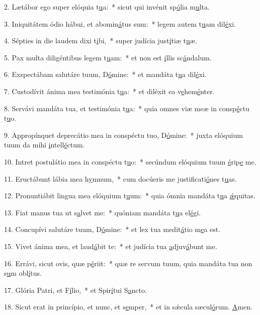 2. Lætábor ego super elóquia t\uline{u}a:~* sicut qui invénit sp\uline{ó}lia m\uline{u}lta.\par 
3. Iniquitátem ódio hábui, et abomin\uline{á}tus sum:~* legem autem t\uline{u}am dil\uline{é}xi.\par 
4. Sépties in die laudem dixi t\uline{i}bi,~* super judícia just\uline{í}tiæ t\uline{u}æ.\par 
5. Pax multa diligéntibus legem t\uline{u}am:~* et non est \uline{i}llis sc\uline{á}ndalum.\par 
6. Exspectábam salutáre tuum, D\uline{ó}mine:~* et mandáta t\uline{u}a dil\uline{é}xi.\par 
7. Custodívit ánima mea testimónia t\uline{u}a:~* et diléxit ea v\uline{e}hem\uline{é}nter.\par 
8. Servávi mandáta tua, et testimónia t\uline{u}a:~* quia omnes viæ meæ in consp\uline{é}ctu t\uline{u}o.\par 
9. Appropínquet deprecátio mea in conspéctu tuo, D\uline{ó}mine:~* juxta elóquium tuum da mihi \uline{i}ntell\uline{é}ctum.\par 
10. Intret postulátio mea in conspéctu t\uline{u}o:~* secúndum elóquium tuum \uline{é}rip\uline{e} me.\par 
11. Eructábunt lábia mea h\uline{y}mnum,~* cum docúeris me justificati\uline{ó}nes t\uline{u}as.\par 
12. Pronuntiábit lingua mea elóquium t\uline{u}um:~* quia ómnia mandáta t\uline{u}a \uline{ǽ}quitas.\par 
13. Fiat manus tua ut s\uline{a}lvet me:~* quóniam mandáta t\uline{u}a el\uline{é}gi.\par 
14. Concupívi salutáre tuum, D\uline{ó}mine:~* et lex tua medit\uline{á}tio m\uline{e}a est.\par 
15. Vivet ánima mea, et laud\uline{á}bit te:~* et judícia tua \uline{a}djuv\uline{á}bunt me.\par 
16. Errávi, sicut ovis, quæ p\uline{é}riit:~* quæ re servum tuum, quia mandáta tua non s\uline{u}m obl\uline{í}tus.\par 
17. Glória Patri, et F\uline{í}lio,~* et Spir\uline{í}tui S\uline{a}ncto.\par 
18. Sicut erat in princípio, et nunc, et s\uline{e}mper,~* et in sǽcula sæcul\uline{ó}rum. \uline{A}men.\par 
